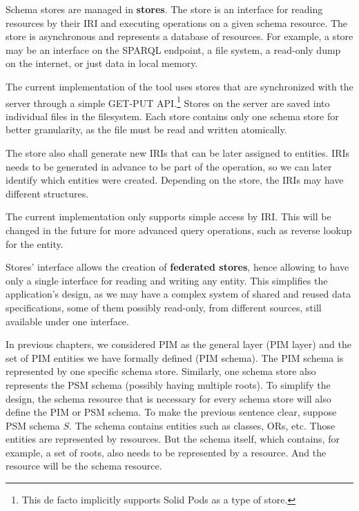 Schema stores are managed in \textbf{stores}. The store is an interface for reading resources by their IRI and executing operations on a given schema resource. The store is asynchronous and represents a database of resources. For example, a store may be an interface on the SPARQL endpoint, a file system, a read-only dump on the internet, or just data in local memory.

The current implementation of the tool uses stores that are synchronized with the server through a simple GET-PUT API.\footnote{This de facto implicitly supports Solid Pods as a type of store.} Stores on the server are saved into individual files in the filesystem. Each store contains only one schema store for better granularity, as the file must be read and written atomically.

\medskip

The store also shall generate new IRIs that can be later assigned to entities. IRIs needs to be generated in advance to be part of the operation, so we can later identify which entities were created. Depending on the store, the IRIs may have different structures.

The current implementation only supports simple access by IRI. This will be changed in the future for more advanced query operations, such as reverse lookup for the entity.

\medskip

Stores' interface allows the creation of \textbf{federated stores}, hence allowing to have only a single interface for reading and writing any entity. This simplifies the application's design, as we may have a complex system of shared and reused data specifications, some of them possibly read-only, from different sources, still available under one interface.

\medskip

In previous chapters, we considered PIM as the general layer (PIM layer) and the set of PIM entities we have formally defined (PIM schema). The PIM schema is represented by one specific schema store. Similarly, one schema store also represents the PSM schema (possibly having multiple roots). To simplify the design, the schema resource that is necessary for every schema store will also define the PIM or PSM schema. To make the previous sentence clear, suppose PSM schema $S$. The schema contains entities such as classes, ORs, etc. Those entities are represented by resources. But the schema itself, which contains, for example, a set of roots, also needs to be represented by a resource. And the resource will be the schema resource.

